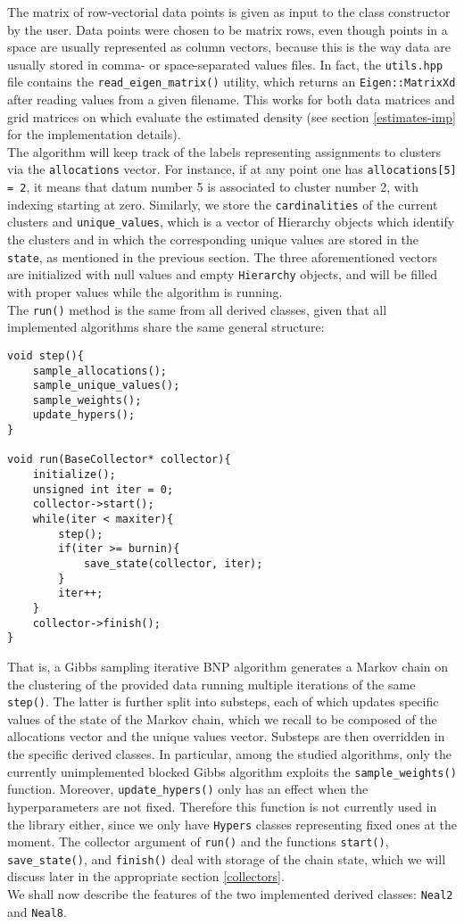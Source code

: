 The matrix of row-vectorial data points is given as input to the class constructor by the user.
Data points were chosen to be matrix rows, even though points in a space are usually represented as column vectors, because this is the way data are usually stored in comma- or space-separated values files.
In fact, the \verb|utils.hpp| file contains the \verb|read_eigen_matrix()| utility, which returns an \verb|Eigen::MatrixXd| after reading values from a given filename.
This works for both data matrices and grid matrices on which evaluate the estimated density (see section \ref{estimates-imp} for the implementation details). \\
The algorithm will keep track of the labels representing assignments to clusters via the \verb|allocations| vector.
For instance, if at any point one has \verb|allocations[5] = 2|, it means that datum number 5 is associated to cluster number 2, with indexing starting at zero.
Similarly, we store the \verb|cardinalities| of the current clusters and \verb|unique_values|, which is a vector of Hierarchy objects which identify the clusters and in which the corresponding unique values are stored in the \verb|state|, as mentioned in the previous section.
The three aforementioned vectors are initialized with null values and empty \verb|Hierarchy| objects, and will be filled with proper values while the algorithm is running. \\
The \verb|run()| method is the same from all derived classes, given that all implemented algorithms share the same general structure:
\begin{verbatim}
void step(){
    sample_allocations();
    sample_unique_values();
    sample_weights();
    update_hypers();
}

void run(BaseCollector* collector){
    initialize();
    unsigned int iter = 0;
    collector->start();
    while(iter < maxiter){
        step();
        if(iter >= burnin){
            save_state(collector, iter);
        }
        iter++;
    }
    collector->finish();
}    
\end{verbatim}
That is, a Gibbs sampling iterative BNP algorithm generates a Markov chain on the clustering of the provided data running multiple iterations of the same \verb|step()|.
The latter is further split into substeps, each of which updates specific values of the state of the Markov chain, which we recall to be composed of the allocations vector and the unique values vector.
Substeps are then overridden in the specific derived classes.
In particular, among the studied algorithms, only the currently unimplemented blocked Gibbs algorithm exploits the \verb|sample_weights()| function.
Moreover, \verb|update_hypers()| only has an effect when the hyperparameters are not fixed.
Therefore this function is not currently used in the library either, since we only have \verb|Hypers| classes representing fixed ones at the moment.
The collector argument of \verb|run()| and the functions \verb|start()|, \verb|save_state()|, and \verb|finish()| deal with storage of the chain state, which we will discuss later in the appropriate section \ref{collectors}. \\
We shall now describe the features of the two implemented derived classes: \verb|Neal2| and \verb|Neal8|.

